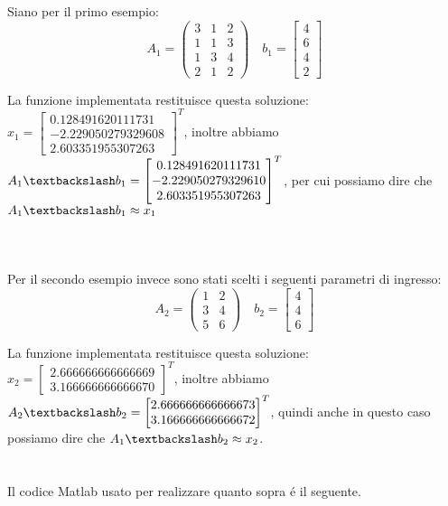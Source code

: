 \begin{center}
\footnotesize\noindent{}\end{center}

\noindent Siano per il primo esempio:
\[
A_1 = \begin{pmatrix} 3 & 1 & 2 \\ 1 & 1& 3 \\ 1 & 3 & 4 \\ 2 & 1 & 2 \end{pmatrix} \quad b_1 = \begin{bmatrix} 4\\6\\4\\2 \end{bmatrix}
\]

\noindent La funzione implementata restituisce questa soluzione: \(x_1 = \begin{bmatrix} 0.128491620111731 \\ -2.229050279329608 \\ 2.603351955307263 \end{bmatrix}^T\), inoltre abbiamo \(A_1 \textbackslash b_1 = \begin{bmatrix} 0.128491620111731 \\ -2.229050279329610 \\ 2.603351955307263 \end{bmatrix}^T\), per cui possiamo dire che \(A_1 \textbackslash b_1 \approx x_1\)
\\
\\
\\
\\

\noindent Per il secondo esempio invece sono stati scelti i seguenti parametri di ingresso:
\[
A_2 = \begin{pmatrix} 1 & 2 \\ 3 & 4 \\ 5 & 6 \end{pmatrix} \quad b_2 = \begin{bmatrix} 4\\4\\6 \end{bmatrix}
\]

\noindent La funzione implementata restituisce questa soluzione: \(x_2=\begin{bmatrix} 2.666666666666669 \\ 3.166666666666670 \end{bmatrix}^T\), inoltre abbiamo \(A_2 \textbackslash b_2 = \begin{bmatrix} 2.666666666666673 \\ 3.166666666666672 \end{bmatrix}^T\), quindi anche in questo caso possiamo dire che \(A_1 \textbackslash b_2 \approx x_2\).
\\
\\
\\
\noindent Il codice Matlab usato per realizzare quanto sopra \'e il seguente.
\\


